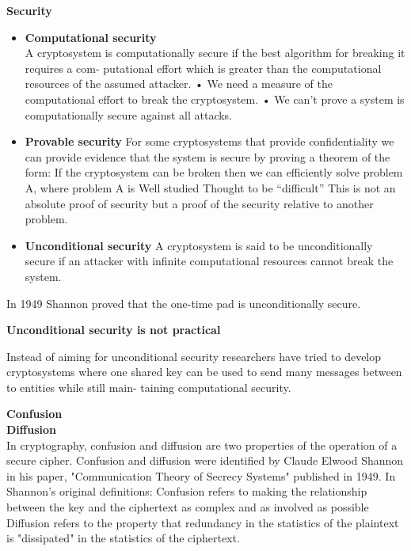 \textbf{Security}
\begin{itemize}
    \item \textbf{Computational security}\\
        A cryptosystem is computationally secure if the best algorithm for breaking it requires a com- putational effort which is greater than the computational resources of the assumed attacker.
        • We need a measure of the computational effort to break the cryptosystem. • We can’t prove a system is computationally secure against all attacks.

    \item \textbf{Provable security}
        For some cryptosystems that provide confidentiality we can provide evidence that the system is secure by proving a theorem of the form:
        If the cryptosystem can be broken then we can efficiently solve problem A, where problem A is
        Well studied
        Thought to be “difficult”
        This is not an absolute proof of security but a proof of the security relative to another problem.

    \item \textbf{Unconditional security}
        A cryptosystem is said to be unconditionally secure if an attacker with infinite computational resources cannot break the system.

\end{itemize}

In 1949 Shannon proved that the one-time pad is unconditionally secure.
\begin{definition}
\end{definition}

\textbf{Unconditional security is not practical}

Instead of aiming for unconditional security researchers have tried to develop cryptosystems where one shared key can be used to send many messages between to entities while still main- taining computational security.


\textbf{Confusion}\\
\textbf{Diffusion}\\
In cryptography, confusion and diffusion are two properties of the operation of a secure cipher.
Confusion and diffusion were identified by Claude Elwood Shannon in his paper, "Communication Theory of Secrecy Systems" published in 1949. In Shannon's original definitions:
Confusion refers to making the relationship between the key and the ciphertext as complex and as involved as possible
Diffusion refers to the property that redundancy in the statistics of the plaintext is "dissipated" in the statistics of the ciphertext.

